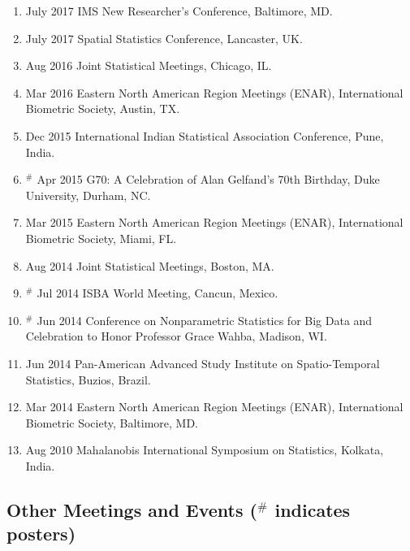 \documentclass[12pt]{article}
\newcommand{\myben}[1]{\smallskip\begin{enumerate}[start=1,label={\scriptsize \arabic*$\ $},leftmargin=\parindent]\setlength{\itemsep}{#1}\vspace*{-0.7em}}
\newcommand{\ee}{\end{enumerate}}
\begin{document}
\myben{0.3em}
\item July 2017 IMS New Researcher’s Conference, Baltimore, MD.
\item July 2017 Spatial Statistics Conference, Lancaster, UK.
\item Aug 2016 Joint Statistical Meetings, Chicago, IL.
\item Mar 2016 Eastern North American Region Meetings (ENAR), International Biometric
Society, Austin, TX.
\item Dec 2015 International Indian Statistical Association Conference, Pune, India.
\item $^\#$ Apr 2015 G70: A Celebration of Alan Gelfand’s 70th Birthday, Duke University, Durham, NC.
\item Mar 2015 Eastern North American Region Meetings (ENAR), International Biometric
Society, Miami, FL.
\item Aug 2014 Joint Statistical Meetings, Boston, MA.
\item $^\#$ Jul 2014 ISBA World Meeting, Cancun, Mexico.
\item $^\#$ Jun 2014 Conference on Nonparametric Statistics for Big Data and Celebration to Honor
Professor Grace Wahba, Madison, WI.
\item Jun 2014 Pan-American Advanced Study Institute on Spatio-Temporal Statistics, Buzios,
Brazil.
\item Mar 2014 Eastern North American Region Meetings (ENAR), International Biometric
Society, Baltimore, MD.
\item Aug 2010 Mahalanobis International Symposium on Statistics, Kolkata, India.
\ee


\subsection*{Other Meetings and Events ($^\#$ indicates posters)}
\end{document}
